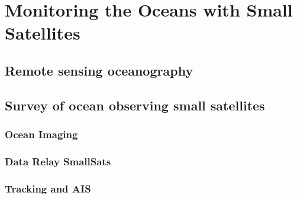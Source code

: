 %
%
%


\chapter{Monitoring the Oceans with Small Satellites}
\label{chp:Oceanography}


\section{Remote sensing oceanography}
\label{sec:Oceanography_RemoteSensing}

{\small\textit{\lipsum[1-2]}}


\section{Survey of ocean observing small satellites}
\label{sec:Oceanography_SmallSatSurvey}

{\small\textit{\lipsum[1-2]}}

\subsection{Ocean Imaging}
\label{subsec:Ocean_Imaging}

{\small\textit{\lipsum[1-2]}}

\subsection{Data Relay SmallSats}
\label{subsec:Data_Relay}

{\small\textit{\lipsum[1-2]}}

\subsection{Tracking and AIS}
\label{subsec:AIS}


